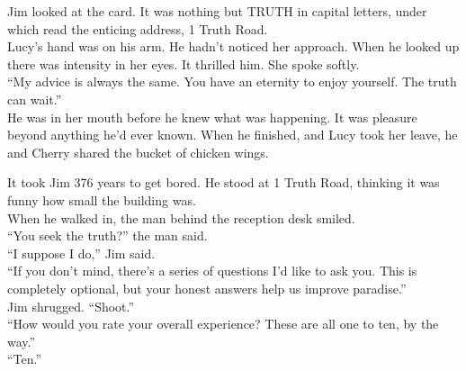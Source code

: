 Jim looked at the card.  It was nothing but TRUTH in capital letters, under which read the enticing address, 1 Truth Road.\\



Lucy's hand was on his arm.  He hadn't noticed her approach.  When he looked up there was intensity in her eyes.  It thrilled him.  She spoke softly.\\



\enquote{My advice is always the same.  You have an eternity to enjoy yourself.  The truth can wait.}\\



He was in her mouth before he knew what was happening.  It was pleasure beyond anything he'd ever known.  When he finished, and Lucy took her leave, he and Cherry shared the bucket of chicken wings.\\

\asterism

It took Jim 376 years to get bored.  He stood at 1 Truth Road, thinking it was funny how small the building was.\\



When he walked in, the man behind the reception desk smiled.\\



\enquote{You seek the truth?}  the man said.\\



\enquote{I suppose I do,} Jim said.\\



\enquote{If you don't mind, there's a series of questions I'd like to ask you.  This is completely optional, but your honest answers help us improve paradise.}\\



Jim shrugged.  \enquote{Shoot.}\\



\enquote{How would you rate your overall experience?  These are all one to ten, by the way.}\\



\enquote{Ten.}\\



